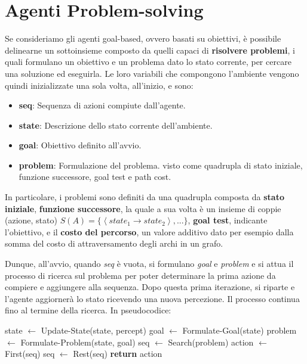 %

\section{Agenti Problem-solving}
Se consideriamo gli agenti goal-based, ovvero basati su obiettivi, è possibile delinearne un sottoinsieme composto da quelli capaci di \textbf{risolvere
problemi}, i quali formulano un obiettivo e un problema dato lo stato corrente, per cercare una soluzione ed eseguirla.
Le loro variabili che compongono l'ambiente vengono quindi inizializzate una sola volta, all'inizio, e sono: \begin{itemize}
    \item \textbf{seq}: Sequenza di azioni compiute dall'agente.
    \item \textbf{state}: Descrizione dello stato corrente dell'ambiente.
    \item \textbf{goal}: Obiettivo definito all'avvio.
    \item \textbf{problem}: Formulazione del problema. visto come quadrupla di stato iniziale, funzione successore, goal test e path cost.
\end{itemize}

\noindent In particolare, i problemi sono definiti da una quadrupla composta da \textbf{stato iniziale}, \textbf{funzione successore}, la quale a sua
volta è un insieme di coppie (azione, stato) $S(A) = \{\left<state_1\to state_2\right>, ...\}$, \textbf{goal test}, indicante l'obiettivo, e il
\textbf{costo del percorso}, un valore additivo dato per esempio dalla somma del costo di attraversamento degli archi in un grafo.\par
Dunque, all'avvio, quando \textit{seq} è vuota, si formulano \textit{goal} e \textit{problem} e si attua il processo di ricerca sul problema per poter
determinare la prima azione da compiere e aggiungere alla sequenza. Dopo questa prima iterazione, si riparte e l'agente aggiornerà lo stato ricevendo
una nuova percezione. Il processo continua fino al termine della ricerca. In pseudocodice: \begin{algorithm}[h]
    \caption{Simple-Problem-Solving-Agent(percept) \textbf{returns} action}
    \begin{algorithmic}[i]
        \State state $\gets$ Update-State(state, percept)
            \State goal $\gets$ Formulate-Goal(state)
            \State problem $\gets$ Formulate-Problem(state, goal)
            \State seq $\gets$ Search(problem)
        \EndIf
        \State action $\gets$ First(seq)
        \State seq $\gets$ Rest(seq)
        \State \textbf{return} action
    \end{algorithmic}
\end{algorithm}

